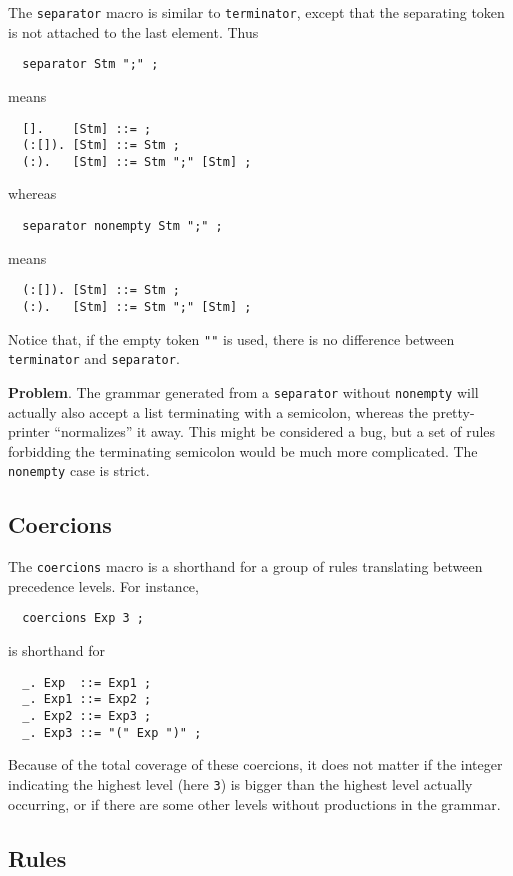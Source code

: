 \documentclass[10pt]{article}
\begin{document}
The \verb$separator$ macro is similar to \verb$terminator$,
except that the separating token is not attached to the last
element. Thus
\begin{verbatim}
  separator Stm ";" ;
\end{verbatim}
means
\begin{verbatim}
  [].    [Stm] ::= ;
  (:[]). [Stm] ::= Stm ;
  (:).   [Stm] ::= Stm ";" [Stm] ;
\end{verbatim}
whereas
\begin{verbatim}
  separator nonempty Stm ";" ;
\end{verbatim}
means
\begin{verbatim}
  (:[]). [Stm] ::= Stm ;
  (:).   [Stm] ::= Stm ";" [Stm] ;
\end{verbatim}
Notice that, if the empty token \verb$""$ is used, there
is no difference between \verb$terminator$ and \verb$separator$.




{\bf Problem}.
The grammar generated from
a \verb$separator$ without \verb$nonempty$
will actually
also accept a list terminating with a semicolon, whereas 
the pretty-printer ``normalizes'' it away. This might be considered
a bug, but a set of rules 
forbidding the terminating semicolon would be much more 
complicated. The \verb$nonempty$ case is strict.



\subsection{Coercions}
\label{coercions}

The \verb$coercions$ macro is a shorthand for a group of rules
translating between precedence levels. For instance,
\begin{verbatim}
  coercions Exp 3 ;
\end{verbatim}
is shorthand for
\begin{verbatim}
  _. Exp  ::= Exp1 ;
  _. Exp1 ::= Exp2 ;
  _. Exp2 ::= Exp3 ;
  _. Exp3 ::= "(" Exp ")" ;
\end{verbatim}
Because of the total coverage of these coercions,
it does not matter if the integer indicating the highest level
(here \verb$3$) is bigger than the highest level actually occurring,
or if there are some other levels without productions in the grammar.



\subsection{Rules}
\end{document}
